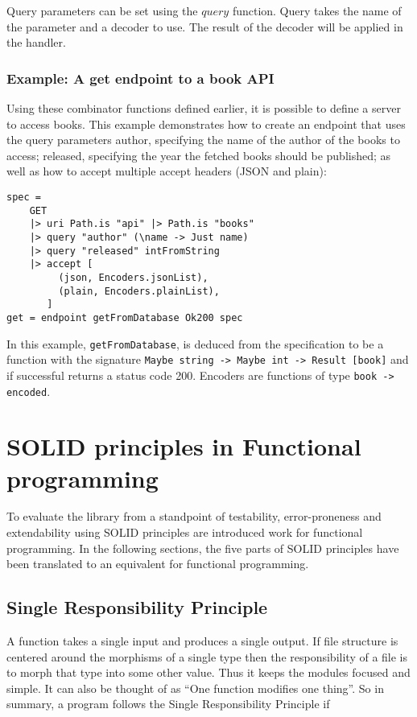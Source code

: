 Query parameters can be set using the $query$ function. Query takes the name of
the parameter and a decoder to use. The result of the decoder will be applied in
the handler.

\subsubsection{Example: A get endpoint to a book API}

Using these combinator functions defined earlier, it is possible to define a
server to access books. This example demonstrates how to create an endpoint that
uses the query parameters author, specifying the name of the author of the
books to access; released, specifying the year the fetched books should be
published; as well as how to accept multiple accept headers (JSON and plain):


\begin{lstlisting}
spec = 
    GET
    |> uri Path.is "api" |> Path.is "books"
    |> query "author" (\name -> Just name)
    |> query "released" intFromString
    |> accept [
         (json, Encoders.jsonList),
         (plain, Encoders.plainList),
       ]
get = endpoint getFromDatabase Ok200 spec
\end{lstlisting}

In this example, \texttt{getFromDatabase}, is deduced from the specification to
be a function with the signature \texttt{Maybe string -> Maybe int -> Result
[book]} and if successful returns a status code 200. Encoders are functions of
type \texttt{book -> encoded}. 

\section{SOLID principles in Functional programming}\label{dependencyinjection}

To evaluate the library from a standpoint of testability, error-proneness and
extendability using SOLID principles are introduced work for functional
programming. In the following sections, the five parts of SOLID principles have
been translated to an equivalent for functional programming.

\subsection{Single Responsibility Principle}

A function takes a single input and produces a single output. If file structure
is centered around the morphisms of a single type then the responsibility of a
file is to morph that type into some other value. Thus it keeps the modules
focused and simple. It can also be thought of as ``One function modifies one
thing''. So in summary, a program follows the Single Responsibility Principle if 

